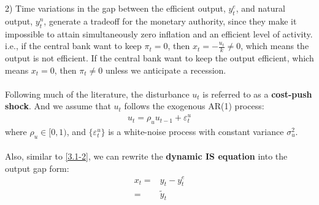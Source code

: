 \documentclass{article}
\numberwithin{equation}{section}
\begin{document}
2) Time variations in the gap between the efficient output, $y^e_t$, and natural output, $y^n_t$, generate a tradeoff for the monetary authority, since they make it impossible to attain simultaneously zero inflation and an efficient level of activity.\\
\indent i.e., if the central bank want to keep $\pi_t = 0$, then $x_t = -\frac{u_t}{k} \neq 0$, which means the output is not efficient. If the central bank want to keep the output efficient, which means $x_t = 0$, then $\pi_t \neq 0$ unless we anticipate a recession.\\\\
Following much of the literature, the disturbance $u_t$ is referred to as a \textbf{cost-push shock}. And we assume that $u_t$ follows the exogenous AR(1) process:
	\begin{align}
		u_t = \rho_u u_{t-1} + \varepsilon^u_t \label{3.1-3}
	\end{align}
where $\rho_u \in [0, 1)$, and $\{ \varepsilon^u_t \}$ is a white-noise process with constant variance $\sigma^2_u$.\\\\
Also, similar to \eqref{3.1-2}, we can rewrite the \textbf{dynamic IS equation} into the output gap form:
	\begin{align}
		x_t = &y_t - y^e_t\\
		= &\tilde{y}_t 
	\end{align}
\end{document}
